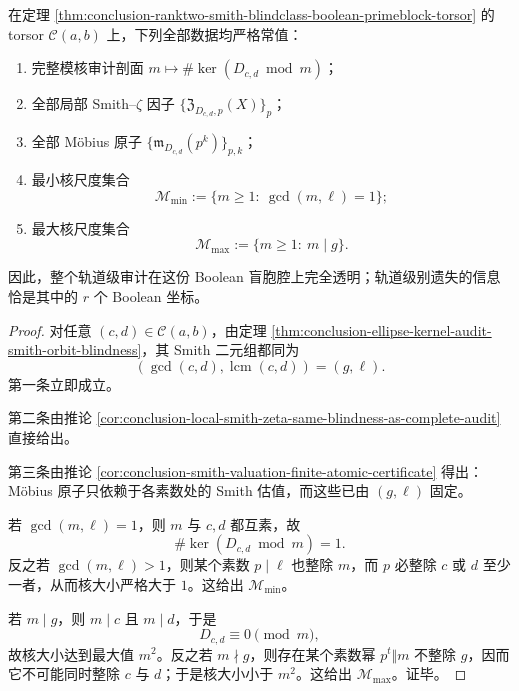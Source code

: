 \begin{corollary}\label{cor:conclusion-ranktwo-smith-audit-constant-on-boolean-torsor}
在定理 \ref{thm:conclusion-ranktwo-smith-blindclass-boolean-primeblock-torsor} 的 torsor \(\mathcal C(a,b)\) 上，下列全部数据均严格常值：
\begin{enumerate}
  \item 完整模核审计剖面 \(m\mapsto \#\ker(D_{c,d}\bmod m)\)；
  \item 全部局部 Smith--\(\zeta\) 因子 \(\{\mathfrak Z_{D_{c,d},p}(X)\}_{p}\)；
  \item 全部 Möbius 原子 \(\{\mathfrak m_{D_{c,d}}(p^k)\}_{p,k}\)；
  \item 最小核尺度集合
  \[
  \mathcal M_{\min}:=\{m\ge 1:\ \gcd(m,\ell)=1\};
  \]
  \item 最大核尺度集合
  \[
  \mathcal M_{\max}:=\{m\ge 1:\ m\mid g\}.
  \]
\end{enumerate}
因此，整个轨道级审计在这份 Boolean 盲胞腔上完全透明；轨道级别遗失的信息恰是其中的 \(r\) 个 Boolean 坐标。
\end{corollary}
\begin{proof}
对任意 \((c,d)\in \mathcal C(a,b)\)，由定理 \ref{thm:conclusion-ellipse-kernel-audit-smith-orbit-blindness}，其 Smith 二元组都同为
\[
(\gcd(c,d),\operatorname{lcm}(c,d))=(g,\ell).
\]
第一条立即成立。

第二条由推论 \ref{cor:conclusion-local-smith-zeta-same-blindness-as-complete-audit} 直接给出。

第三条由推论 \ref{cor:conclusion-smith-valuation-finite-atomic-certificate} 得出：Möbius 原子只依赖于各素数处的 Smith 估值，而这些已由 \((g,\ell)\) 固定。

若 \(\gcd(m,\ell)=1\)，则 \(m\) 与 \(c,d\) 都互素，故
\[
\#\ker(D_{c,d}\bmod m)=1.
\]
反之若 \(\gcd(m,\ell)>1\)，则某个素数 \(p\mid \ell\) 也整除 \(m\)，而 \(p\) 必整除 \(c\) 或 \(d\) 至少一者，从而核大小严格大于 \(1\)。这给出 \(\mathcal M_{\min}\)。

若 \(m\mid g\)，则 \(m\mid c\) 且 \(m\mid d\)，于是
\[
D_{c,d}\equiv 0\pmod m,
\]
故核大小达到最大值 \(m^2\)。反之若 \(m\nmid g\)，则存在某个素数幂 \(p^t\Vert m\) 不整除 \(g\)，因而它不可能同时整除 \(c\) 与 \(d\)；于是核大小小于 \(m^2\)。这给出 \(\mathcal M_{\max}\)。证毕。
\end{proof}

